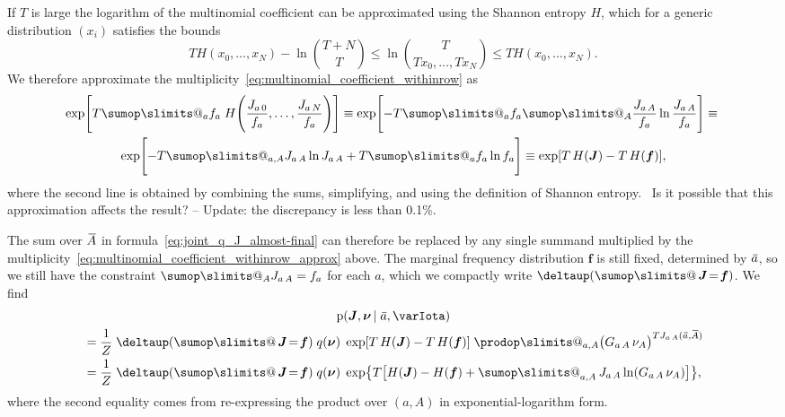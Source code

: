 \documentclass[\ifafour a4paper,12pt,\else a5paper,10pt,\fi%
onecolumn,oneside,article,%
british%
]{memoir}
\makeatletter
\theoremstyle{remark}
\theoremstyle{innote}
\def\sum{\DOTSI\sumop\slimits@}
\def\prod{\DOTSI\prodop\slimits@}
\newcommand*{\delt}{\deltaup}%
\newcommand*{\di}{\mathrm{d}}%
\renewcommand*{\le}{\leqslant}%
\newcommand*{\pf}{\mathrm{p}}%
\renewcommand*{\|}[1][]{\nonscript\,#1\vert\nonscript\;\mathopen{}}
\newcommand*{\tsum}{\mathop{\textstyle\sum}\nolimits}
\newcommand*{\puzzle}{{\fontencoding{U}\fontfamily{fontawesometwo}\selectfont\symbol{225}}}
\newcommand{\mynote}[1]{ {\color{notecolour}\puzzle\ #1}}
\newcommand*{\widebar}[1]{{\mkern1.5mu\skew{2}\overline{\mkern-1.5mu#1\mkern-1.5mu}\mkern 1.5mu}}
\newcommand*{\yff}{f}
\newcommand*{\yf}{\bm{\yff}}
\newcommand*{\yAs}{\widebar{A}}%
\newcommand*{\yas}{\widebar{a}}%
\newcommand*{\yI}{\varIota}
\newcommand*{\ysh}{H}
\newcommand*{\yJJ}{J}
\newcommand*{\yJ}{\bm{\yJJ}}
\newcommand*{\ynuu}{\nu}
\newcommand*{\ynu}{\bm{\ynuu}}
\newcommand*{\yeq}{\mathrel{\!=\!}}
\makeatother
\begin{document}
If $T$ is large the logarithm of the multinomial coefficient can be
approximated using the Shannon entropy $\ysh$, which for a generic
distribution $(x_{i})$ satisfies the bounds 
\begin{equation}
  \label{eq:approx_multinomial}
  T \ysh(x_{0},\dotsc,x_{N}) - \ln\binom{T+N}{T} \le
  \ln\binom{T}{Tx_{0},\dotsc,Tx_{N}} \le T \ysh(x_{0},\dotsc,x_{N}).
\end{equation}
We therefore approximate the
multiplicity~\eqref{eq:multinomial_coefficient_withinrow} as
\begin{multline}
  \label{eq:multinomial_coefficient_withinrow_approx}
  \exp\Biggl[T\sum_{a} f_{a}\;\ysh\Biggl(
\frac{J_{a\,0}}{f_{a}}, \dotsc,
\frac{J_{a\,N}}{f_{a}}\Biggr)
    \Biggr] \equiv
  \exp\Biggl[-T\sum_{a} f_{a} \sum_{A}
    \frac{J_{a\,A}}{f_{a}}\ln\frac{J_{a\,A}}{f_{a}}
    \Biggr]
    \equiv{}\\
    \exp\Biggl[-T \sum_{a,A} J_{a\,A}\ln J_{a\,A} + T  \sum_{a} f_{a}\ln f_{a}\Biggr]
    \equiv
    \exp[T\,\ysh(\yJ) - T\,\ysh(\yf)],
\end{multline}
where the second line is obtained by combining the sums, simplifying, and
using the definition of Shannon entropy. \mynote{Is it possible that this
  approximation affects the result? -- Update: the discrepancy is less than
0.1\%.}

\bigskip

The sum over $\yAs$ in formula~\eqref{eq:joint_q_J_almost-final} can
therefore be replaced by any single summand multiplied by the
multiplicity~\eqref{eq:multinomial_coefficient_withinrow_approx} above. The
marginal frequency distribution $\yf$ is still fixed, determined by $\yas$,
so we still have the constraint $\sum_{A}J_{a\,A}=f_{a}$ for each $a$,
which we compactly write $\delt(\tsum\yJ\yeq \yf)$. We find
\begin{multline}
  \label{eq:final_expression_multiplicity}
      \pf(\yJ, \ynu \| \yas, \yI) \\
  \begin{aligned}
  &=\frac{1}{Z}\;\delt(\tsum\yJ \yeq \yf)
  \;q(\ynu)\;
  \exp[T\,\ysh(\yJ) - T\,\ysh(\yf)]\;
  \prod_{a,A} \bigl(G_{a\,A}\,\nu_{A}\bigr)^{T J_{a\,A}(\yas,\yAs)}
  \\
     &=
  \frac{1}{Z}\;\delt(\tsum\yJ \yeq \yf)
  \;q(\ynu)\;%
  \exp\bigl\{T\bigl[
  \ysh(\yJ) - \ysh(\yf)
  + \tsum_{a,A} J_{a\,A}\ln(G_{a\,A}\,\nu_{A})
  \bigr]\bigr\},
\end{aligned}
\end{multline}
where the second equality comes from re-expressing the product over $(a,A)$
in exponential-logarithm form.
\end{document}
